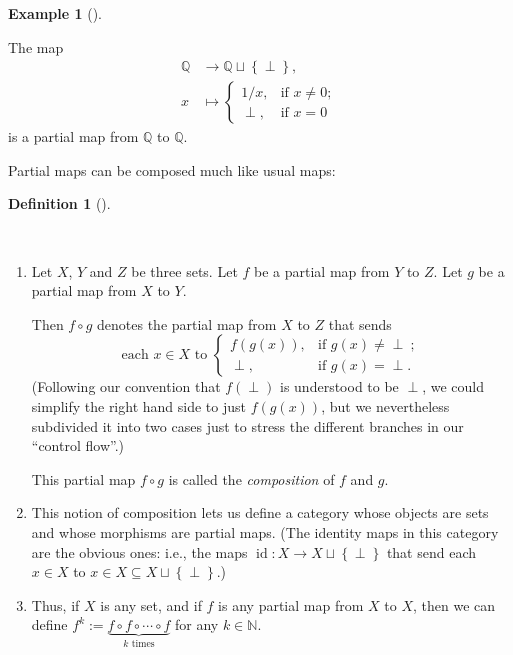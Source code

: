 \documentclass[numbers=enddot,12pt,final,onecolumn,notitlepage]{scrartcl}%
\theoremstyle{definition}
\newtheorem{defi}[theo]{Definition}
\newenvironment{definition}[1][]
{\begin{defi}[#1]\begin{leftbar}}
{\end{leftbar}\end{defi}}
\newtheorem{exam}[theo]{Example}
\newenvironment{example}[1][]
{\begin{exam}[#1]\begin{leftbar}}
{\end{leftbar}\end{exam}}
\newcommand{\undf}{\operatorname*{\bot}}
\begin{document}
\begin{example}
The map%
\begin{align*}
\mathbb{Q}  &  \rightarrow\mathbb{Q}\sqcup\left\{  \undf\right\}  ,\\
x  &  \mapsto%
\begin{cases}
1/x, & \text{if }x\neq0;\\
\undf, & \text{if }x=0
\end{cases}
\end{align*}
is a partial map from $\mathbb{Q}$ to $\mathbb{Q}$.
\end{example}

Partial maps can be composed much like usual maps:

\begin{definition}
\ \ 

\begin{enumerate}
\item[\textbf{(a)}] Let $X$, $Y$ and $Z$ be three sets. Let $f$ be a partial
map from $Y$ to $Z$. Let $g$ be a partial map from $X$ to $Y$.

Then $f\circ g$ denotes the partial map from $X$ to $Z$ that sends
\[
\text{each }x\in X\text{ to }%
\begin{cases}
f\left(  g\left(  x\right)  \right)  , & \text{if }g\left(  x\right)
\neq\undf\ ;\\
\undf, & \text{if }g\left(  x\right)  =\undf.
\end{cases}
\]
(Following our convention that $f\left(  \undf\right)  $ is understood to be
$\undf$, we could simplify the right hand side to just $f\left(  g\left(
x\right)  \right)  $, but we nevertheless subdivided it into two cases just to
stress the different branches in our \textquotedblleft control
flow\textquotedblright.)

This partial map $f\circ g$ is called the \emph{composition} of $f$ and $g$.

\item[\textbf{(b)}] This notion of composition lets us define a category whose
objects are sets and whose morphisms are partial maps. (The identity maps in
this category are the obvious ones: i.e., the maps $\operatorname*{id}%
:X\rightarrow X\sqcup\left\{  \undf\right\}  $ that send each $x\in X$ to
$x\in X\subseteq X\sqcup\left\{  \undf\right\}  $.)

\item[\textbf{(c)}] Thus, if $X$ is any set, and if $f$ is any partial map
from $X$ to $X$, then we can define $f^{k}:=\underbrace{f\circ f\circ
\cdots\circ f}_{k\text{ times}}$ for any $k\in\mathbb{N}$.
\end{enumerate}
\end{definition}
\end{document}
